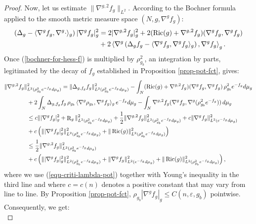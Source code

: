 \documentclass[a4paper,11pt,reqno]{amsart}
\def\Ric{\mathop{\rm Ric}\nolimits}
\def\Ric{\mathop{\rm Ric}\nolimits}
\def\R{\mathop{\rm R}\nolimits}
\numberwithin{equation}{section}
\begin{document}
\begin{proof}
		
		Now, let us estimate $\|\nabla^{g,2}f_g\|_{L^2}$. According to the Bochner formula applied to the smooth metric measure space $\left(N,g,\nabla^gf_g\right)$:
		\begin{equation}
		\begin{split}
		\left(\Delta_g-\langle\nabla^gf_g,\nabla^g\cdot\rangle_g\right)|\nabla^g f_g|_g^2&=2|\nabla^{g,2}f_g|^2_g+2(\Ric(g)+\nabla^{g,2}f_g)(\nabla^gf_g,\nabla^gf_g)\\
		&+2\left\langle\nabla^g\left(\Delta_gf_g-\langle\nabla^gf_g,\nabla^gf_g\rangle_g\right),\nabla^gf_g\right\rangle_g.\label{bochner-for-hess-f}
		\end{split}
		\end{equation}
		Once (\ref{bochner-for-hess-f}) is multiplied by $\rho_{g_b}^2$, an integration by parts, legitimated by the decay of $f_g$ established in Proposition \ref{prop-pot-fct}, gives:
		\begin{equation}
		\begin{split}\label{IPP-Monster}
		\|\nabla^{g,2}f_g\|&_{L^2(\rho_{g_b}^2e^{-f_g}d\mu_g)}^2=\|\Delta_{g,f_g}f_g\|^2_{L^2(\rho_{g_b}^2e^{-f_g}d\mu_g)}-\int_N(\Ric(g)+\nabla^{g,2}f_g)(\nabla^gf_g,\nabla^gf_g)\,\rho_{g_b}^2e^{-f_g}d\mu_g\\
		&+2\int_N\Delta_{g,f_g}f_g\,\rho_{g_b}\,\langle\nabla^{g}\rho_{g_b},\nabla^gf_g\rangle_g\,e^{-f_g}d\mu_g-\int_N\nabla^{g,2}f_g(\nabla^gf_g,\nabla^g(\rho_{g_b}^2e^{-f_g}))\,d\mu_g\\
		&\leq c\||\nabla^gf_g|^2_g+\R_g\|_{L^2(\rho_{g_b}^2e^{-f_g}d\mu_g)}^2+\frac{1}{2}\|\nabla^{g,2}f_g\|_{L^2(\rho_{g_b}^2e^{-f_g}d\mu_g)}^2+c\|\nabla^gf_g\|_{L^2(e^{-f_g}d\mu_g)}^2\\
		&+c\left(\||\nabla^gf_g|^2_g\|^2_{L^2(\rho_{g_b}^2e^{-f_g}d\mu_g)}+\|\Ric(g)\|_{L^2(\rho_{g_b}^2e^{-f_g}d\mu_g)}^2\right)\\
		&\leq\frac{1}{2}\|\nabla^{g,2}f_g\|_{L^2(\rho_{g_b}^2e^{-f_g}d\mu_g)}^2\\
		&+c\left(\||\nabla^gf_g|^2_g\|^2_{L^2(\rho_{g_b}^2e^{-f_g}d\mu_g)}+\|\nabla^gf_g\|^2_{L^2(e^{-f_g}d\mu_g)}+\|\Ric(g)\|_{L^2(\rho_{g_b}^2e^{-f_g}d\mu_g)}^2\right),
		\end{split}
		\end{equation}
		where we use (\ref{equ-criti-lambda-pot}) together with Young's inequality in the third line and where $c=c(n)$ denotes a positive constant that may vary from line to line. By Proposition \ref{prop-pot-fct}, $\rho_{g_b}|\nabla^gf_g|_g\leq C(n,\varepsilon,g_b)$ pointwise. Consequently, we get:
		\begin{equation*}

\end{equation*}
\end{proof}
\end{document}
